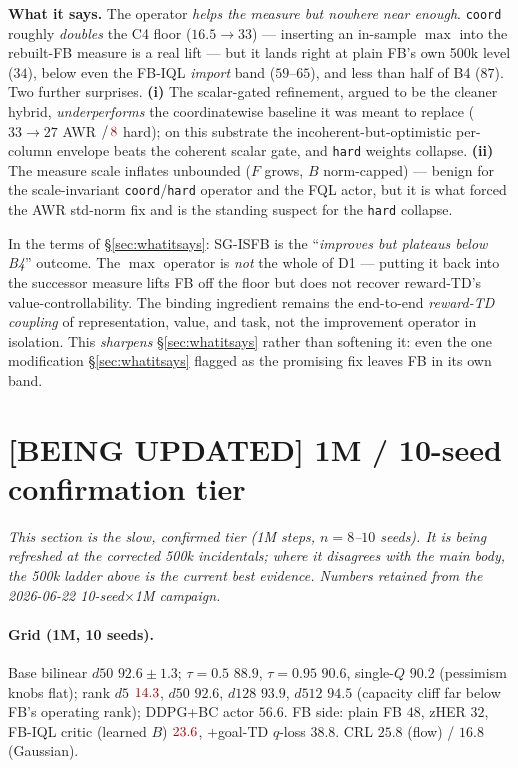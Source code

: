 \documentclass[11pt]{article}
\newcommand{\B}[1]{\textbf{#1}}
\newcommand{\bad}[1]{\textcolor{red!70!black}{#1}}
\begin{document}
\noindent\B{What it says.} The operator \emph{helps the measure but nowhere near
enough}. \texttt{coord} roughly \emph{doubles} the C4 floor ($16.5{\to}33$) ---
inserting an in-sample $\max$ into the rebuilt-FB measure is a real lift --- but it
lands right at plain FB's own 500k level ($34$), below even the FB-IQL \emph{import}
band ($59$--$65$), and less than half of B4 ($87$). Two further surprises. \B{(i)}
The scalar-gated refinement, argued to be the cleaner hybrid, \emph{underperforms}
the coordinatewise baseline it was meant to replace ($33{\to}27$ AWR $/\,\bad 8$
hard); on this substrate the incoherent-but-optimistic per-column envelope beats the
coherent scalar gate, and \texttt{hard} weights collapse. \B{(ii)} The measure scale
inflates unbounded ($F$ grows, $B$ norm-capped) --- benign for the scale-invariant
\texttt{coord}/\texttt{hard} operator and the FQL actor, but it is what forced the
AWR std-norm fix and is the standing suspect for the \texttt{hard} collapse.

\noindent In the terms of \S\ref{sec:whatitsays}: SG-ISFB is the
``\emph{improves but plateaus below B4}'' outcome. The $\max$ operator is \emph{not}
the whole of D1 --- putting it back into the successor measure lifts FB off the floor
but does not recover reward-TD's value-controllability. The binding ingredient
remains the end-to-end \emph{reward-TD coupling} of representation, value, and task,
not the improvement operator in isolation. This \emph{sharpens} \S\ref{sec:whatitsays}
rather than softening it: even the one modification \S\ref{sec:whatitsays} flagged as
the promising fix leaves FB in its own band.

\section{[BEING UPDATED] 1M / 10-seed confirmation tier}
\label{sec:1M}
\emph{This section is the slow, confirmed tier (1M steps, $n{=}8$--$10$ seeds). It
is being refreshed at the corrected 500k incidentals; where it disagrees with the
main body, the 500k ladder above is the current best evidence. Numbers retained
from the 2026-06-22 10-seed$\times$1M campaign.}

\paragraph{Grid (1M, 10 seeds).} Base bilinear $d50$ $\mathbf{92.6\pm1.3}$;
$\tau{=}0.5$ $88.9$, $\tau{=}0.95$ $90.6$, single-$Q$ $90.2$ (pessimism knobs
flat); rank $d5$ $\bad{14.3}$, $d50$ $92.6$, $d128$ $93.9$, $d512$ $94.5$ (capacity
cliff far below FB's operating rank); DDPG+BC actor $56.6$. FB side: plain FB $48$,
zHER $32$, FB-IQL critic (learned $B$) $\bad{23.6}$, $+$goal-TD $q$-loss $38.8$.
CRL $25.8$ (flow) / $16.8$ (Gaussian).
\end{document}
